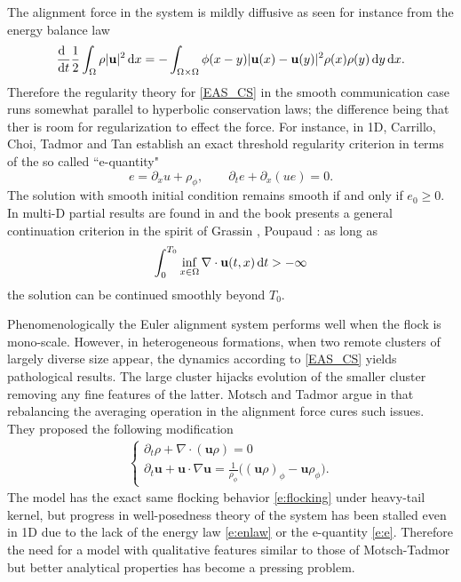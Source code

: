\documentclass[11pt,letterpaper]{amsart}
\theoremstyle{plain}
\theoremstyle{definition}
\theoremstyle{remark}
\def \n {\nabla}
\def \O {\Omega}
\def \bu {{\bf u}}
\renewcommand{\geq}{\geqslant}
\def \dx  {\, \mbox{d}x}
\def \dt  {\, \mbox{d}t}
\def \dy  {\, \mbox{d}y}
\def \ddt  {\frac{\mbox{d\,\,}}{\mbox{d}t}}
\def\u{\textbf{u}}
\begin{document}
The alignment force in the system is mildly diffusive as seen for instance from the energy balance law
\begin{equation}\label{e:enlaw}
\ddt \frac{1}{2} \int_\O \rho |\u|^2 \dx = -  \int_{\O \times \O} \phi(x-y) |\u(x) - \u(y)|^2 \rho(x)\rho(y) \dy \dx.
\end{equation}
Therefore the regularity theory for \eqref{EAS_CS} in the smooth communication case runs somewhat parallel to hyperbolic conservation laws; the difference being that 
ther is room for regularization to effect the force. For instance, in 1D, Carrillo, Choi, Tadmor and Tan \cite{CCTT2016} establish an exact threshold regularity criterion in terms of the so called ``e-quantity"
\begin{equation}\label{e:e}
e = \partial_x u + \rho_\phi, \qquad \partial_t e + \partial_x (u e) = 0.
\end{equation}
The solution with smooth initial condition remains smooth if and only if $e_0 \geq 0$. In multi-D partial results are found in \cite{HKK2014,HKK2015,HeT2017,TT2014} and the book \cite{Sbook} presents a general continuation criterion in the spirit of Grassin \cite{Grassin99}, Poupaud \cite{Poupaud99}: as long as 
	\begin{equation}\label{e:BKMdiv}
\int_0^{T_0} \inf_{x\in \O} \n \cdot \bu(t,x) \dt > - \infty
\end{equation}
the solution can be continued smoothly beyond $T_0$. 

Phenomenologically the Euler alignment system performs well when the flock is mono-scale. 
However, in heterogeneous formations, when two remote clusters of largely diverse size appear, the dynamics according to \eqref{EAS_CS} yields pathological results. 
The large cluster hijacks evolution of the smaller cluster removing any fine features of the latter. 
Motsch and Tadmor argue in \cite{MT2011,MT2014} that rebalancing the averaging operation in the alignment force cures such issues. 
They proposed the following modification
\begin{align}
    \label{EAS_MT}
    \tag{MT}
    \begin{cases}
        \partial_t \rho + \nabla \cdot (\u \rho) = 0 \\
        \partial_t \u + \u \cdot \nabla \u = \frac{1}{\rho_{\phi}} \big( (\u\rho)_{\phi} - \u\rho_{\phi} \big).
    \end{cases}
\end{align}
The model has the exact same flocking behavior \eqref{e:flocking} under heavy-tail kernel, but progress in well-posedness theory of the system has been stalled even in 1D due to the lack of the energy law \eqref{e:enlaw} or the e-quantity \eqref{e:e}. 
Therefore the need for a model with qualitative features similar to those of Motsch-Tadmor but better analytical properties has become a pressing problem.
\end{document}
